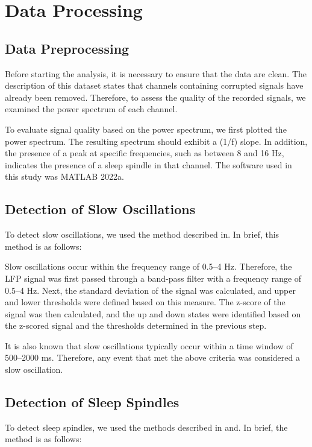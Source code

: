 \documentclass[12pt]{report}
\begin{document}
	\section{Data Processing}
	\label{Data Processing}
	\subsection{Data Preprocessing}
	\label{Data Preprocessing}
	Before starting the analysis, it is necessary to ensure that the data are clean. The description of this dataset states that channels containing corrupted signals have already been removed. Therefore, to assess the quality of the recorded signals, we examined the power spectrum of each channel.
	
	To evaluate signal quality based on the power spectrum, we first plotted the power spectrum. The resulting spectrum should exhibit a (1/f) slope\cite{Fernandez2020}. In addition, the presence of a peak at specific frequencies, such as between 8 and 16 Hz, indicates the presence of a sleep spindle in that channel\cite{Fernandez2020}.
	The software used in this study was MATLAB 2022a.
	\subsection{Detection of Slow Oscillations}
	\label{Detection of Slow Oscillations}
	To detect slow oscillations, we used the method described in\cite{Watson2016}. In brief, this method is as follows:
	
	Slow oscillations occur within the frequency range of 0.5–4 Hz. Therefore, the LFP signal was first passed through a band-pass filter with a frequency range of 0.5–4 Hz. Next, the standard deviation of the signal was calculated, and upper and lower thresholds were defined based on this measure. The z-score of the signal was then calculated, and the up and down states were identified based on the z-scored signal and the thresholds determined in the previous step.
	
	It is also known that slow oscillations typically occur within a time window of 500–2000 ms. Therefore, any event that met the above criteria was considered a slow oscillation.
	\subsection{Detection of Sleep Spindles}
	\label{Detection of Sleep Spindles}
	To detect sleep spindles, we used the methods described in\cite{Bernyi2014} and\cite{Watson2016}. In brief, the method is as follows:
	
\end{document}
